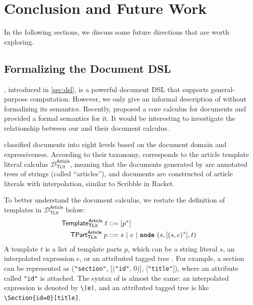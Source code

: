 \chapter{Conclusion and Future Work} \label{ch:conclusion}

In the following sections, we discuss some future directions that are worth
exploring.

\section{Formalizing the Document DSL}

\newcommand{\DArtTLit}{$\mathcal{D}^\mathsf{Article}_\mathsf{TLit}$\xspace}
\newcommand{\DArtTProg}{$\mathcal{D}^\mathsf{Article}_\mathsf{TProg}$\xspace}
\newcommand{\kw}[1]{\text{\ttfamily\bfseries #1}}

\ExT, introduced in \autoref{sec:dsl}, is a powerful document DSL that supports
general-purpose computation. However, we only give an informal description of
\ExT without formalizing its semantics. Recently, \citet{crichton2024core}
proposed a core calculus for documents and provided a formal semantics for it.
It would be interesting to investigate the relationship between our \ExT and
their document calculus.

\citeauthor{crichton2024core} classified documents into eight levels based on
the document domain and expressiveness. According to their taxonomy, \ExT
corresponds to the article template literal calculus \DArtTLit, meaning that the
documents generated by \ExT are annotated trees of strings (called
``articles''), and documents are constructed of article literals with
interpolation, similar to Scribble in Racket.

To better understand the document calculus, we restate the definition of
templates in \DArtTLit below:
\begin{align*}
\mathsf{Template}^\mathsf{Article}_\mathsf{TLit} \; t&::= [p^*] \\
   \mathsf{TPart}^\mathsf{Article}_\mathsf{TLit} \; p&::= s ~|~ e ~|~ \kw{node}\ (s, [(s,e)^*], t)
\end{align*}
A template $t$ is a list of template parts $p$, which can be a string literal
$s$, an interpolated expression $e$, or an attributed tagged tree \kw{node}. For
example, a section can be represented as \kw{node} (\lstinline{"section"},
[(\lstinline{"id"}, 0)], [\lstinline{"title"}]), where an attribute called
\lstinline{"id"} is attached. The syntax of \ExT is almost the same: an
interpolated expression is denoted by \lstinline{\(e)}, and an attributed tagged
tree is like \lstinline|\Section{id=0}[title]|.


